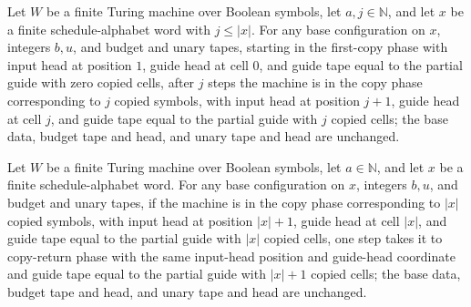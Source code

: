 \begin{lemma}
\label{Complexity.setupCfg_copy_prefix}
\leanok
{}
Let $W$ be a finite Turing machine over Boolean symbols, let $a,j\in\mathbb{N}$, and let
$x$ be a finite schedule-alphabet word with $j\le |x|$. For any base configuration on
$x$, integers $b,u$, and budget and unary tapes, starting in the first-copy phase with
input head at position $1$, guide head at cell $0$, and guide tape equal to the partial
guide with zero copied cells, after $j$ steps the machine is in the copy phase
corresponding to $j$ copied symbols, with input head at position $j+1$, guide head at
cell $j$, and guide tape equal to the partial guide with $j$ copied cells; the base
data, budget tape and head, and unary tape and head are unchanged.
\end{lemma}

\begin{lemma}
\label{Complexity.setupCfg_copy_end}
\leanok
{}
Let $W$ be a finite Turing machine over Boolean symbols, let $a\in\mathbb{N}$, and let
$x$ be a finite schedule-alphabet word. For any base configuration on $x$, integers
$b,u$, and budget and unary tapes, if the machine is in the copy phase corresponding to
$|x|$ copied symbols, with input head at position $|x|+1$, guide head at cell $|x|$, and
guide tape equal to the partial guide with $|x|$ copied cells, one step takes it to
copy-return phase with the same input-head position and guide-head coordinate and guide
tape equal to the partial guide with $|x|+1$ copied cells; the base data, budget tape
and head, and unary tape and head are unchanged.
\end{lemma}

